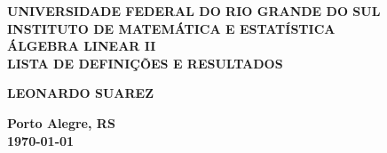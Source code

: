 \documentclass{article}
\theoremstyle{plain}
\theoremstyle{definition}
\theoremstyle{remark}
\begin{document}
\begin{center}
    \textbf{\large UNIVERSIDADE FEDERAL DO RIO GRANDE DO SUL} \\
    \textbf{\large INSTITUTO DE MATEMÁTICA E ESTATÍSTICA} \\
    \vspace{3cm}
    \textbf{\Large ÁLGEBRA LINEAR II} \\
    \vspace{1cm}
    \textbf{\large LISTA DE DEFINIÇÕES E RESULTADOS} \\
    \vspace{3cm}

    \textbf{LEONARDO SUAREZ}

    \vfill
    \textbf{\large Porto Alegre, RS} \\
    \textbf{\large \today}
\end{center}

\newpage
\tableofcontents
\newpage
\end{document}
